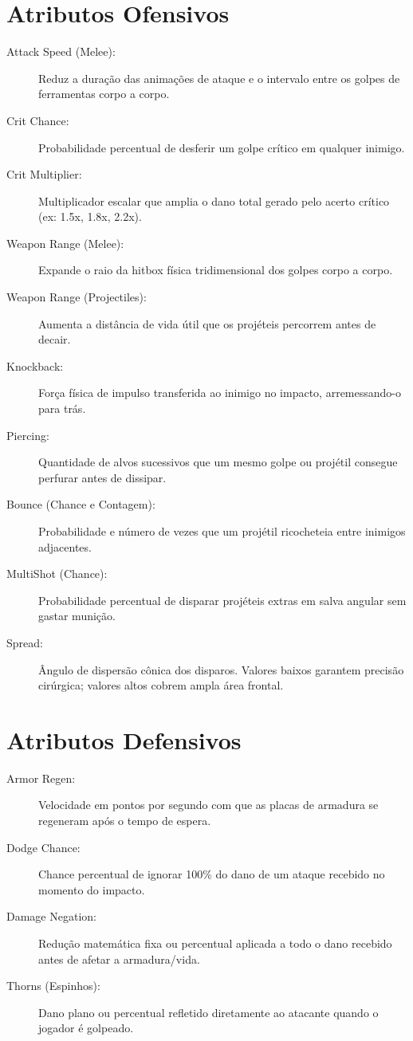 \documentclass[a4paper,12pt]{report}
\begin{document}
\section{Atributos Ofensivos}
\begin{description}
    \item[Attack Speed (Melee):] Reduz a duração das animações de ataque e o intervalo entre os golpes de ferramentas corpo a corpo.
    \item[Crit Chance:] Probabilidade percentual de desferir um golpe crítico em qualquer inimigo.
    \item[Crit Multiplier:] Multiplicador escalar que amplia o dano total gerado pelo acerto crítico (ex: 1.5x, 1.8x, 2.2x).
    \item[Weapon Range (Melee):] Expande o raio da hitbox física tridimensional dos golpes corpo a corpo.
    \item[Weapon Range (Projectiles):] Aumenta a distância de vida útil que os projéteis percorrem antes de decair.
    \item[Knockback:] Força física de impulso transferida ao inimigo no impacto, arremessando-o para trás.
    \item[Piercing:] Quantidade de alvos sucessivos que um mesmo golpe ou projétil consegue perfurar antes de dissipar.
    \item[Bounce (Chance e Contagem):] Probabilidade e número de vezes que um projétil ricocheteia entre inimigos adjacentes.
    \item[MultiShot (Chance):] Probabilidade percentual de disparar projéteis extras em salva angular sem gastar munição.
    \item[Spread:] Ângulo de dispersão cônica dos disparos. Valores baixos garantem precisão cirúrgica; valores altos cobrem ampla área frontal.
\end{description}

\section{Atributos Defensivos}
\begin{description}
    \item[Armor Regen:] Velocidade em pontos por segundo com que as placas de armadura se regeneram após o tempo de espera.
    \item[Dodge Chance:] Chance percentual de ignorar 100\% do dano de um ataque recebido no momento do impacto.
    \item[Damage Negation:] Redução matemática fixa ou percentual aplicada a todo o dano recebido antes de afetar a armadura/vida.
    \item[Thorns (Espinhos):] Dano plano ou percentual refletido diretamente ao atacante quando o jogador é golpeado.
\end{description}
\end{document}
